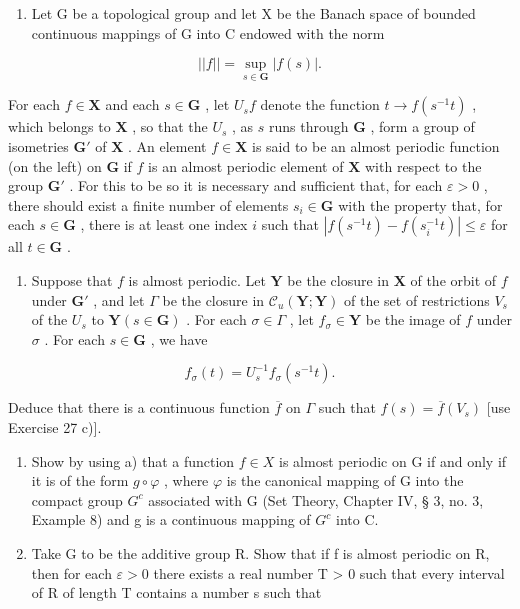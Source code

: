 \begin{enumerate}
\def\labelenumi{\arabic{enumi})}
\setcounter{enumi}{27}
\tightlist
\item
  Let G be a topological group and let X be the Banach space of bounded continuous mappings of G into C endowed with the norm
\end{enumerate}

\[
\left| \left| f \right| \right| = \sup _ {s \in \mathbf {G}} | f (s) |.
\]

For each \(f \in \mathbf{X}\) and each \(s \in \mathbf{G}\) , let \(U_s f\) denote the function \(t \to f(s^{-1}t)\) , which belongs to \(\mathbf{X}\) , so that the \(U_s\) , as \(s\) runs through \(\mathbf{G}\) , form a group of isometries \(\mathbf{G}'\) of \(\mathbf{X}\) . An element \(f \in \mathbf{X}\) is said to be an almost periodic function (on the left) on \(\mathbf{G}\) if \(f\) is an almost periodic element of \(\mathbf{X}\) with respect to the group \(\mathbf{G}'\) . For this to be so it is necessary and sufficient that, for each \(\varepsilon > 0\) , there should exist a finite number of elements \(s_i \in \mathbf{G}\) with the property that, for each \(s \in \mathbf{G}\) , there is at least one index \(i\) such that \(|f(s^{-1}t) - f(s_{i}^{-1}t)| \leqslant \varepsilon\) for all \(t \in \mathbf{G}\) .

\begin{enumerate}
\def\labelenumi{\alph{enumi})}
\tightlist
\item
  Suppose that \(f\) is almost periodic. Let \(\mathbf{Y}\) be the closure in \(\mathbf{X}\) of the orbit of \(f\) under \(\mathbf{G}'\) , and let \(\Gamma\) be the closure in \(\mathcal{C}_u(\mathbf{Y};\mathbf{Y})\) of the set of restrictions \(V_s\) of the \(U_s\) to \(\mathbf{Y} (s\in \mathbf{G})\) . For each \(\sigma \in \Gamma\) , let \(f_{\sigma}\in \mathbf{Y}\) be the image of \(f\) under \(\sigma\) . For each \(s\in \mathbf{G}\) , we have
\end{enumerate}

\[
f _ {\sigma} (t) = U _ {s} ^ {- 1} f _ {\sigma} (s ^ {- 1} t).
\]

Deduce that there is a continuous function \(\overline{f}\) on \(\Gamma\) such that \(f(s) = \overline{f}(V_s)\) {[}use Exercise 27 c){]}.

\begin{enumerate}
\def\labelenumi{\alph{enumi})}
\setcounter{enumi}{1}
\tightlist
\item
  Show by using a) that a function \(f \in X\) is almost periodic on G if and only if it is of the form \(g \circ \varphi\) , where \(\varphi\) is the canonical mapping of G into the compact group \(G^{c}\) associated with G (Set Theory, Chapter IV, § 3, no. 3, Example 8) and g is a continuous mapping of \(G^{c}\) into C.
\item
  Take G to be the additive group R. Show that if f is almost periodic on R, then for each \(\varepsilon > 0\) there exists a real number T \textgreater{} 0 such that every interval of R of length T contains a number s such that
\end{enumerate}

